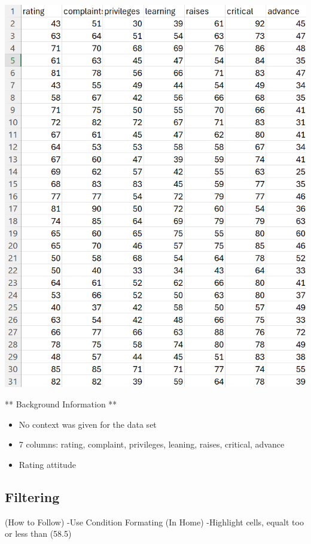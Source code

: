\documentclass[
  letterpaper,
  DIV=11,
  numbers=noendperiod]{scrreprt}
\providecommand{\tightlist}{%
  \setlength{\itemsep}{0pt}\setlength{\parskip}{0pt}}\usepackage{longtable,booktabs,array}
\begin{document}
\includegraphics{./Excel_1_Unit/Week1_Diego/Week_1DJ/screenshots/Attitude_Base.png}

** Background Information **

\begin{itemize}
\tightlist
\item
  No context was given for the data set
\item
  7 columns: rating, complaint, privileges, leaning, raises, critical,
  advance
\item
  Rating attitude
\end{itemize}

\subsection{Filtering}\label{filtering}

(How to Follow) -Use Condition Formating (In Home) -Highlight cells,
equalt too or less than (58.5)
\end{document}
